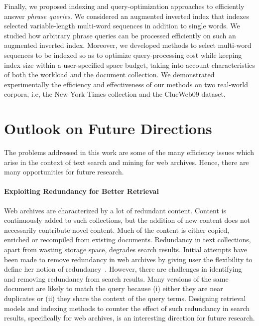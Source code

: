 Finally, we proposed indexing and query-optimization approaches to efficiently answer \emph{phrase queries}. We considered an augmented inverted index that indexes selected variable-length multi-word sequences in addition to single words. We studied how arbitrary phrase queries can be processed efficiently on such an augmented inverted index. Moreover, we developed methods to select multi-word sequences to be indexed so as to optimize query-processing cost while keeping index size within a user-specified space budget, taking into account characteristics of both the workload and the document collection. We demonstrated experimentally the efficiency and effectiveness of our methods on two real-world corpora, i.e, the New York Times collection and the ClueWeb09 dataset.

\section{Outlook on Future Directions}

The problems addressed in this work are some of the many efficiency issues which arise in the context of text search and mining for web archives. Hence, there are many opportunities for future research. 

\paragraph{Exploiting Redundancy for Better Retrieval} Web archives are characterized by a lot of redundant content. Content is continuously added to such collections, but the addition of new content does not necessarily contribute novel content. Much of the content is either copied, enriched or recompiled from existing documents. Redundancy in text collections, apart from wasting storage space, degrades search results. Initial attempts have been made to remove redundancy in web archives by giving user the flexibility to define her notion of redundancy~\cite{paudel2013}. However, there are challenges in identifying and removing redundancy from search results. Many versions of the same document are likely to match the query because (i) either they are near duplicates or (ii) they share the context of the query terms. Designing retrieval models and indexing methods to counter the effect of such redundancy in search results, specifically for web archives, is an interesting direction for future research.

